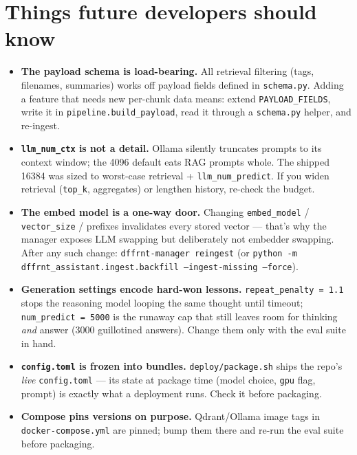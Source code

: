\documentclass[11pt,letterpaper]{article}
\let\oldsection\section
\renewcommand{\section}{\vspace{1em}\oldsection}
\begin{document}
\section{Things future developers should know}

\begin{itemize}
  \item \textbf{The payload schema is load-bearing.} All retrieval
        filtering (tags, filenames, summaries) works off payload fields
        defined in \texttt{schema.py}. Adding a feature that needs new
        per-chunk data means: extend \texttt{PAYLOAD\_FIELDS}, write it in
        \texttt{pipeline.build\_payload}, read it through a
        \texttt{schema.py} helper, and re-ingest.
  \item \textbf{\texttt{llm\_num\_ctx} is not a detail.} Ollama silently
        truncates prompts to its context window; the 4096 default eats RAG
        prompts whole. The shipped 16384 was sized to worst-case retrieval
        + \texttt{llm\_num\_predict}. If you widen retrieval
        (\texttt{top\_k}, aggregates) or lengthen history, re-check the
        budget.
  \item \textbf{The embed model is a one-way door.} Changing
        \texttt{embed\_model} / \texttt{vector\_size} / prefixes
        invalidates every stored vector --- that's why the manager exposes
        LLM swapping but deliberately not embedder swapping. After any such
        change: \texttt{dffrnt-manager reingest} (or \texttt{python -m
        dffrnt\_assistant.ingest.backfill --ingest-missing --force}).
  \item \textbf{Generation settings encode hard-won lessons.}
        \texttt{repeat\_penalty = 1.1} stops the reasoning model looping
        the same thought until timeout; \texttt{num\_predict = 5000} is the
        runaway cap that still leaves room for thinking \emph{and} answer
        (3000 guillotined answers). Change them only with the eval suite in
        hand.
  \item \textbf{\texttt{config.toml} is frozen into bundles.}
        \texttt{deploy/package.sh} ships the repo's \emph{live}
        \texttt{config.toml} --- its state at package time (model choice,
        \texttt{gpu} flag, prompt) is exactly what a deployment runs. Check
        it before packaging.
  \item \textbf{Compose pins versions on purpose.} Qdrant/Ollama image
        tags in \texttt{docker-compose.yml} are pinned; bump them there and
        re-run the eval suite before packaging.

\end{itemize}
\end{document}
